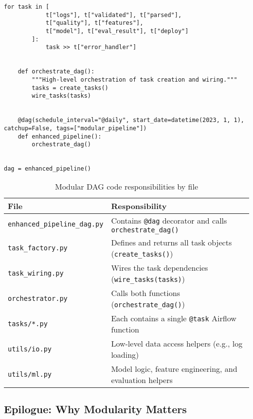 \begin{lstlisting}[caption={Airflow DAG with parallel data quality validation and feature engineering before training.}, label={lst:airflowdag_parallel}]
        for task in [
            t["logs"], t["validated"], t["parsed"],
            t["quality"], t["features"],
            t["model"], t["eval_result"], t["deploy"]
        ]:
            task >> t["error_handler"]
    
    
    def orchestrate_dag():
        """High-level orchestration of task creation and wiring."""
        tasks = create_tasks()
        wire_tasks(tasks)
    
    
    @dag(schedule_interval="@daily", start_date=datetime(2023, 1, 1), catchup=False, tags=["modular_pipeline"])
    def enhanced_pipeline():
        orchestrate_dag()
    
    
dag = enhanced_pipeline()
\end{lstlisting}
    
\begin{table}[H]
    \centering
    \begin{tabular}{|l|p{10cm}|}
    \hline
    \textbf{File} & \textbf{Responsibility} \\
    \hline
    \texttt{enhanced\_pipeline\_dag.py} & Contains \texttt{@dag} decorator and calls \texttt{orchestrate\_dag()} \\
    \hline
    \texttt{task\_factory.py} & Defines and returns all task objects (\texttt{create\_tasks()}) \\
    \hline
    \texttt{task\_wiring.py} & Wires the task dependencies (\texttt{wire\_tasks(tasks)}) \\
    \hline
    \texttt{orchestrator.py} & Calls both functions (\texttt{orchestrate\_dag()}) \\
    \hline
    \texttt{tasks/*.py} & Each contains a single \texttt{@task} Airflow function \\
    \hline
    \texttt{utils/io.py} & Low-level data access helpers (e.g., log loading) \\
    \hline
    \texttt{utils/ml.py} & Model logic, feature engineering, and evaluation helpers \\
    \hline
    \end{tabular}
    \caption{Modular DAG code responsibilities by file}
    \label{tab:dag_structure}
\end{table}
    

    





\subsection{Epilogue: Why Modularity Matters}

